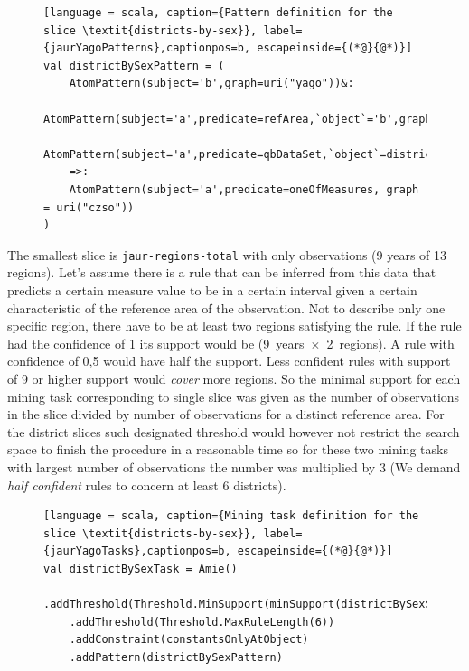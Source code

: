 \begin{figure}[h]
\begin{lstlisting}[language = scala, caption={Pattern definition for the slice \textit{districts-by-sex}}, label={jaurYagoPatterns},captionpos=b, escapeinside={(*@}{@*)}]
val districtBySexPattern = (
    AtomPattern(subject='b',graph=uri("yago"))&:
    AtomPattern(subject='a',predicate=refArea,`object`='b',graph=uri("czso"))&:
    AtomPattern(subject='a',predicate=qbDataSet,`object`=districtBySexSlice,graph=uri("czso"))
    =>: 
    AtomPattern(subject='a',predicate=oneOfMeasures, graph = uri("czso"))
)
\end{lstlisting}
\end{figure}

The smallest slice is \verb|jaur-regions-total| with only  observations (9 years of 13 regions). Let's assume there is a rule that can be inferred from this data that predicts a certain measure value to be in a certain interval given a certain characteristic of the reference area of the observation. Not to describe only one specific region, there have to be at least two regions satisfying the rule. If the rule had the confidence of 1 its support would be  (9~years~$\times$~2~regions). A rule with confidence of 0,5 would have half the support. Less confident rules with support of 9 or higher support would \textit{cover} more regions. So the minimal support for each mining task corresponding to single slice was given as the number of observations in the slice divided by number of observations for a distinct reference area. For the district slices such designated threshold would however not restrict the search space to finish the procedure in a reasonable time so for these two mining tasks with largest number of observations the number was multiplied by 3 (We demand \textit{half confident} rules to concern at least 6 districts).

\begin{figure}[h]
\begin{lstlisting}[language = scala, caption={Mining task definition for the slice \textit{districts-by-sex}}, label={jaurYagoTasks},captionpos=b, escapeinside={(*@}{@*)}]
val districtBySexTask = Amie()
    .addThreshold(Threshold.MinSupport(minSupport(districtBySexSlice)*3))
    .addThreshold(Threshold.MaxRuleLength(6))
    .addConstraint(constantsOnlyAtObject)
    .addPattern(districtBySexPattern)
\end{lstlisting}
\end{figure}

